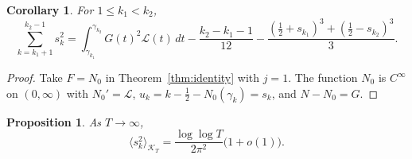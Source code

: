 \documentclass[11pt,a4paper]{article}
\makeatletter
\numberwithin{equation}{section}
\DeclareRobustCommand{\CGref}[1]{\ref{#1}}
\let\CG@origref\ref
\newcommand{\CG@gettip}[1]{\@ifundefined{CGTip@#1}{#1}{\csname CGTip@#1\endcsname}}
\DeclareRobustCommand{\CGref}[1]{\pdftooltip{\CG@origref{#1}}{\CG@gettip{#1}}}
\newtheorem{proposition}[theorem]{Proposition}
\newtheorem{corollary}[theorem]{Corollary}
\theoremstyle{definition}
\theoremstyle{remark}
\newcommand{\Nz}{N_0} %
\newcommand{\lL}{\mathcal L}
\newcommand{\Kc}{\mathcal K}
\makeatother
\begin{document}
\begin{corollary}\label{cor:identity_distance}
For $1\le k_1<k_2$,
\begin{equation}
\sum_{k=k_1+1}^{k_2-1}s_k^2=\int_{\gamma_{k_1}}^{\gamma_{k_2}}G(t)^2\lL(t)\,dt-\frac{k_2-k_1-1}{12}-\frac{(\frac12+s_{k_1})^3+(\frac12-s_{k_2})^3}3 .
\label{eq:identity_distance}
\end{equation}
\end{corollary}

\begin{proof}
Take $F=\Nz$ in Theorem~\CGref{thm:identity} with $j=1$. The function $\Nz$ is $C^\infty$ on $(0,\infty)$ with $\Nz'=\lL$, $u_k=k-\frac12-\Nz(\gamma_k)=s_k$, and $N-\Nz=G$.
\end{proof}

\begin{proposition}\label{prop:s_meansquare}
As $T\to\infty$,
\begin{equation}
\langle s_k^2\rangle_{\Kc_T}=\frac{\log\log T}{2\pi^2}\bigl(1+o(1)\bigr).
\label{eq:s_meansquare}
\end{equation}
\end{proposition}
\end{document}
